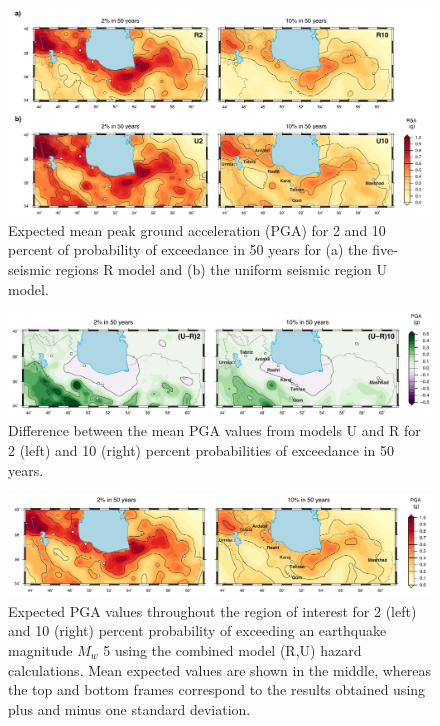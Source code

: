 \begin{figure}[t]
    \centering
    \includegraphics[width=\textwidth]{figures/pdf/figure-08.pdf}
    \caption{Expected mean peak ground acceleration (PGA) for 2 and 10 percent of probability of exceedance in 50 years for (a) the five-seismic regions R model and (b) the uniform seismic region U model.}
    \label{fig:pga}
\end{figure}

\begin{figure}[t]
    \centering
    \includegraphics[width=\textwidth]{figures/pdf/figure-09.pdf}
    \caption{Difference between the mean PGA values from models U and R for 2 (left) and 10 (right) percent probabilities of exceedance in 50 years.}
    \label{fig:pga.diff}
\end{figure}

\begin{figure}[t]
    \centering
    \includegraphics[width=\textwidth]{figures/pdf/figure-10.pdf}
    \caption{Expected PGA values throughout the region of interest for 2 (left) and 10 (right) percent probability of exceeding an earthquake magnitude $M_w$ 5 using the combined model (R,U) hazard calculations. Mean expected values are shown in the middle, whereas the top and bottom frames correspond to the results obtained using plus and minus one standard deviation.}
    \label{fig:pga.ru.std}
\end{figure}

